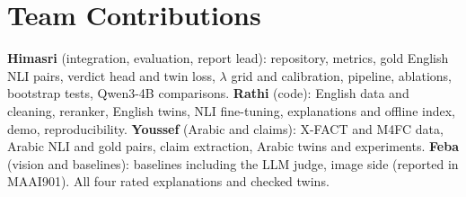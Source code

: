 \section*{Team Contributions}
\textbf{Himasri} (integration, evaluation, report lead): repository, metrics, gold English NLI pairs, verdict head and twin loss, $\lambda$ grid and calibration, pipeline, ablations, bootstrap tests, Qwen3-4B comparisons. \textbf{Rathi} (code): English data and cleaning, reranker, English twins, NLI fine-tuning, explanations and offline index, demo, reproducibility. \textbf{Youssef} (Arabic and claims): X-FACT and M4FC data, Arabic NLI and gold pairs, claim extraction, Arabic twins and experiments. \textbf{Feba} (vision and baselines): baselines including the LLM judge, image side (reported in MAAI901). All four rated explanations and checked twins.





